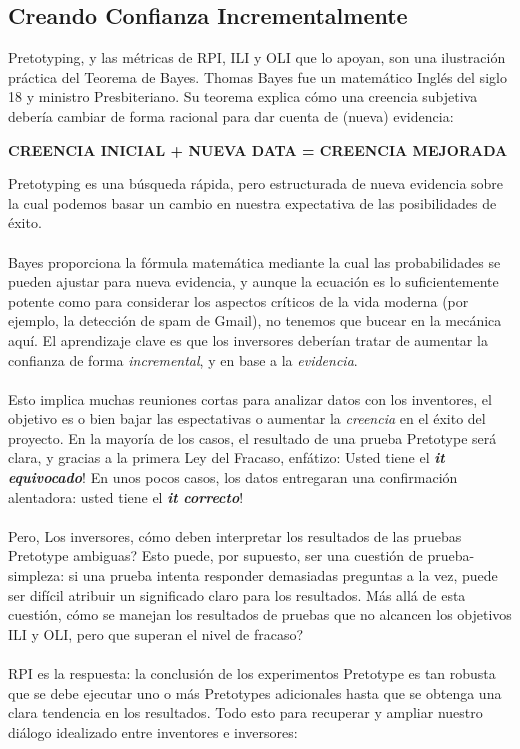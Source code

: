 \documentclass{article}
\begin{document}
\subsection{Creando Confianza Incrementalmente}

Pretotyping, y las m\'etricas de RPI, ILI y OLI que lo apoyan, son una ilustraci\'on pr\'actica del Teorema de Bayes. Thomas Bayes fue un matem\'atico Ingl\'es del siglo 18 y ministro Presbiteriano. Su teorema explica c\'omo una creencia subjetiva deber\'ia cambiar de forma racional para dar cuenta de (nueva) evidencia:

\begin{center}
\textbf{CREENCIA INICIAL + NUEVA DATA = CREENCIA MEJORADA}
\end{center}

Pretotyping es una b\'usqueda r\'apida, pero estructurada de nueva evidencia sobre la cual podemos basar un cambio en nuestra expectativa de las posibilidades de \'exito.
\\ \\
Bayes proporciona la f\'ormula matem\'atica mediante la cual las probabilidades se pueden ajustar para nueva evidencia, y aunque la ecuaci\'on es lo suficientemente potente como para considerar los aspectos cr\'iticos de la vida moderna (por ejemplo, la detecci\'on de spam de Gmail), no tenemos que bucear en la mec\'anica aqu\'i. El aprendizaje clave es que los inversores deber\'ian tratar de aumentar la confianza de forma \textit{incremental}, y en base a la \textit{evidencia}.
\\ \\
Esto implica muchas reuniones cortas para analizar datos con los inventores, el objetivo es o bien bajar las espectativas o aumentar la \textit{creencia} en el \'exito del proyecto. En la mayor\'ia de los casos, el resultado de una prueba Pretotype ser\'a clara, y gracias a la primera Ley del Fracaso, enf\'atizo: Usted tiene el \textbf{\textit{it equivocado}}! En unos pocos casos, los datos entregaran una confirmaci\'on alentadora: usted tiene el \textbf{\textit{it correcto}}!
\\ \\
Pero, Los inversores, c\'omo deben interpretar los resultados de las pruebas Pretotype ambiguas? Esto puede, por supuesto, ser una cuesti\'on de prueba-simpleza: si una prueba intenta responder demasiadas preguntas a la vez, puede ser dif\'icil atribuir un significado claro para los resultados. M\'as all\'a de esta cuesti\'on, c\'omo se manejan los resultados de pruebas que no alcancen los objetivos ILI y OLI, pero que superan el nivel de fracaso?
\\ \\
RPI es la respuesta: la conclusi\'on de los experimentos Pretotype es tan robusta que se debe ejecutar uno o m\'as Pretotypes adicionales hasta que se obtenga una clara tendencia en los resultados. Todo esto para recuperar y ampliar nuestro di\'alogo idealizado entre inventores e inversores:
\end{document}
